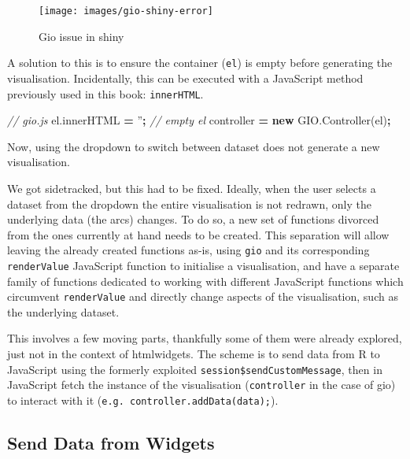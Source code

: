\documentclass[10pt,]{krantz}
\makeatletter
\newenvironment{Shaded}{\begin{snugshade}}{\end{snugshade}}
\newcommand{\AttributeTok}[1]{\textcolor[rgb]{0.61,0.61,0.61}{#1}}
\newcommand{\CommentTok}[1]{\textcolor[rgb]{0.37,0.37,0.37}{\textit{#1}}}
\newcommand{\KeywordTok}[1]{\textcolor[rgb]{0.27,0.27,0.27}{\textbf{#1}}}
\newcommand{\NormalTok}[1]{#1}
\newcommand{\OperatorTok}[1]{\textcolor[rgb]{0.43,0.43,0.43}{\textbf{#1}}}
\newcommand{\StringTok}[1]{\textcolor[rgb]{0.5,0.5,0.5}{#1}}
\newcommand{\VariableTok}[1]{\textcolor[rgb]{0,0,0}{#1}}
\newenvironment{kframe}{%
\medskip{}
\setlength{\fboxsep}{.8em}
 \def\at@end@of@kframe{}%
 \ifinner\ifhmode%
  \def\at@end@of@kframe{\end{minipage}}%
  \begin{minipage}{\columnwidth}%
 \fi\fi%
 \def\FrameCommand##1{\hskip\@totalleftmargin \hskip-\fboxsep
 \colorbox{shadecolor}{##1}\hskip-\fboxsep
     \hskip-\linewidth \hskip-\@totalleftmargin \hskip\columnwidth}%
 \MakeFramed {\advance\hsize-\width
   \@totalleftmargin\z@ \linewidth\hsize
   \@setminipage}}%
 {\par\unskip\endMakeFramed%
 \at@end@of@kframe}
\renewenvironment{Shaded}{\begin{kframe}}{\end{kframe}}
\makeatother
\begin{document}
\begin{figure}[H]

{\centering \texttt{[image: images/gio-shiny-error]} 

}

\caption{Gio issue in shiny}\label{fig:gio-shiny-error}
\end{figure}

A solution to this is to ensure the container (\texttt{el}) is empty before generating the visualisation. Incidentally, this can be executed with a JavaScript method previously used in this book: \texttt{innerHTML}.

\begin{Shaded}
\begin{Highlighting}[]
\CommentTok{// gio.js}
\VariableTok{el}\NormalTok{.}\AttributeTok{innerHTML} \OperatorTok{=} \StringTok{''}\OperatorTok{;} \CommentTok{// empty el}
\NormalTok{controller }\OperatorTok{=} \KeywordTok{new} \VariableTok{GIO}\NormalTok{.}\AttributeTok{Controller}\NormalTok{(el)}\OperatorTok{;}
\end{Highlighting}
\end{Shaded}

Now, using the dropdown to switch between dataset does not generate a new visualisation.

We got sidetracked, but this had to be fixed. Ideally, when the user selects a dataset from the dropdown the entire visualisation is not redrawn, only the underlying data (the arcs) changes. To do so, a new set of functions divorced from the ones currently at hand needs to be created. This separation will allow leaving the already created functions as-is, using \texttt{gio} and its corresponding \texttt{renderValue} JavaScript function to initialise a visualisation, and have a separate family of functions dedicated to working with different JavaScript functions which circumvent \texttt{renderValue} and directly change aspects of the visualisation, such as the underlying dataset.

This involves a few moving parts, thankfully some of them were already explored, just not in the context of htmlwidgets. The scheme is to send data from R to JavaScript using the formerly exploited \texttt{session\$sendCustomMessage}, then in JavaScript fetch the instance of the visualisation (\texttt{controller} in the case of gio) to interact with it (\texttt{e.g.\ controller.addData(data);}).

\hypertarget{shiny-widgets-send-data}{%
\subsection{Send Data from Widgets}\label{shiny-widgets-send-data}}
\end{document}
